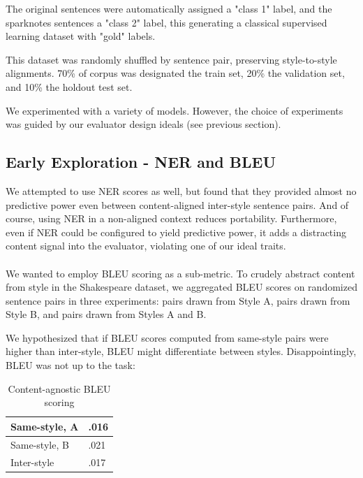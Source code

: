 \documentclass[letterpaper, 10 pt, conference]{ieeeconf}  %
\begin{document}
The original sentences were automatically assigned a "class 1" label, and the sparknotes sentences a "class 2" label, this generating a classical supervised learning dataset with "gold" labels.

This dataset was randomly shuffled by sentence pair, preserving style-to-style alignments. 70\% of corpus was designated the train set, 20\% the validation set, and 10\% the holdout test set.
 
We experimented with a variety of models. However, the choice of experiments was guided by our evaluator design ideals (see previous section).

\subsection{Early Exploration - NER and BLEU}
We attempted to use NER scores as well, but found that they provided almost no predictive power even between content-aligned inter-style sentence pairs. And of course, using NER in a non-aligned context reduces portability. Furthermore, even if NER could be configured to yield predictive power, it adds a distracting content signal into the evaluator, violating one of our ideal traits.
\\ \\

We wanted to employ BLEU scoring as a sub-metric. To crudely abstract content from style in the Shakespeare dataset, we aggregated BLEU scores on randomized sentence pairs in three experiments: pairs drawn from Style A, pairs drawn from Style B, and pairs drawn from Styles A and B.

We hypothesized that if BLEU scores computed from same-style pairs were higher than inter-style, BLEU might differentiate between styles. Disappointingly, BLEU was not up to the task:

\begin{table}[h]
  \caption{Content-agnostic BLEU scoring}
  \label{table_example}
  \begin{center}
    \begin{tabular}{| p{2cm}  | p{2cm} |  }
    \hline
    Same-style, A & .016 \\
    \hline
    Same-style, B & .021\\
    \hline
    Inter-style & .017\\
    \hline
    \end{tabular}
  \end{center}
\end{table}
\end{document}
